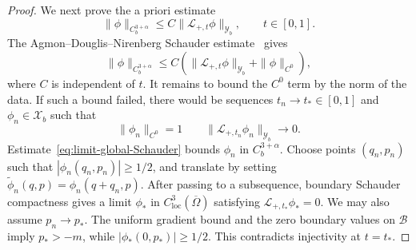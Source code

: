 \documentclass[12pt,letterpaper]{amsart}
\numberwithin{equation}{section}
\begin{document}
\begin{proof}
	{We next prove the a priori estimate}
	\begin{equation}\label{eq:limit-apriori}
		\|\phi\|_{C_b^{3+\alpha}}\leq C\|{\mathscr L_{+,t}}\phi\|_{\mathscr{Y}_b},\qquad t\in[0,1].
	\end{equation}
	{The Agmon--Douglis--Nirenberg Schauder estimate~\cite{agmon} gives}
	\begin{equation}\label{eq:limit-global-Schauder}
	\|\phi\|_{C_b^{3+\alpha}}\leq C(\|\mathscr{L}_{+,t}\phi\|_{\mathscr{Y}_b}+\|\phi\|_{C^0}),
	\end{equation}
	{where $C$ is independent of $t$. It remains to bound the $C^0$ term by the norm of the data. If such a bound failed, there would be sequences $t_n\to t_*\in[0,1]$ and $\phi_n\in\mathscr X_b$ such that}
	\begin{equation*}
		\|\phi_n\|_{C^0}=1\qquad \|\mathscr{L}_{+,t_n}\phi_n\|_{\mathscr{Y}_b}\to0.
	\end{equation*}
	{Estimate~\eqref{eq:limit-global-Schauder} bounds $\phi_n$ in $C_b^{3+\alpha}$.}
	 {Choose points $(q_n,p_n)$ such that $|\phi_n(q_n,p_n)|\geq1/2$, and translate by setting $\tilde\phi_n(q,p)=\phi_n(q+q_n,p)$. After passing to a subsequence, boundary Schauder compactness gives a limit $\phi_*$ in $C_{\mathrm{loc}}^3(\overline\Omega)$ satisfying $\mathscr L_{+,t_*}\phi_*=0$. We may also assume $p_n\to p_*$. The uniform gradient bound and the zero boundary values on $\mathcal B$ imply $p_*>-m$, while $|\phi_*(0,p_*)|\geq1/2$. This contradicts injectivity at $t=t_*$.}



\end{proof}
\end{document}
